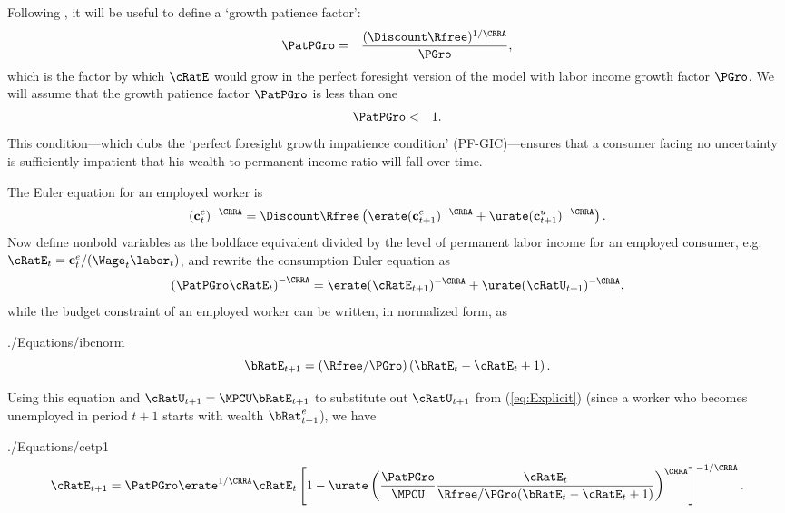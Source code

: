 \documentclass[titlepage]{\econtex}\newcommand{\texname}{cjSOE}
\begin{document}
Following \cite{BufferStockTheory}, it will be useful to define a `growth patience factor':
\begin{eqnarray}
  \PatPGro & = & \frac{(\Discount \Rfree)^{1/\CRRA}}{\PGro},
  \label{eq:PatPGro}
\end{eqnarray}
which is the factor by which $\cRatE$ would grow in the
perfect foresight version of the model with labor income growth factor
$\PGro$.  We will assume that the growth patience factor $\PatPGro$ is less than one
\begin{eqnarray}
\PatPGro & < & 1.
\label{eq:GIC}
\end{eqnarray}
This condition---which \cite{BufferStockTheory} dubs the `perfect foresight growth impatience condition' (PF-GIC)---ensures that a
consumer facing no uncertainty is sufficiently impatient that his
wealth-to-permanent-income ratio will fall over time.

The Euler equation for an employed worker is
\begin{equation*}
(\cLevE_t)^{-\CRRA} = \Discount \Rfree \left(\erate(\cLevE_{t+1})^{-\CRRA}+\urate (\cLevU_{t+1})^{-\CRRA} \right).
\end{equation*}
Now define nonbold variables as the boldface equivalent divided
by the level of permanent labor income for an employed consumer, e.g.\ $\cRatE_{t}=\cLevE_{t}/(\Wage_{t}\labor_{t})$, and rewrite the
consumption Euler equation as
\begin{equation}
\left( \PatPGro \cRatE_t \right)^{-\CRRA}= \erate (\cRatE_{t+1})^{-\CRRA}+\urate (\cRatU_{t+1})^{-\CRRA}
  \label{eq:Explicit},
\end{equation}
while the budget constraint of an employed worker can be written, in normalized form, as
\begin{verbatimwrite}{./Equations/ibcnorm}
\begin{equation}
\bRatE_{t+1} = (\Rfree/\PGro)\left(\bRatE_{t} -\cRatE_{t}+1\right).
\label{eq:ibcnorm}
\end{equation}
\end{verbatimwrite}


Using this equation and $\cRatU_{t+1} = \MPCU \bRatE_{t+1}$ to substitute out $\cRatU_{t+1}$ from (\ref{eq:Explicit}) (since a worker who becomes unemployed in period $t+1$ starts with wealth $\bRat^e_{t+1}$), we have
\begin{verbatimwrite}{./Equations/cetp1}
\begin{equation}
\cRatE_{t+1}=\PatPGro \erate^{1/\CRRA} \cRatE_t
\left[1-\urate\left(\frac{\PatPGro}{\MPCU} \frac{\cRatE_t}{\Rfree/\PGro(\bRatE_{t} -\cRatE_{t}+1)}\right)^{\CRRA}\right]^{-1/\CRRA}.
\label{eq:cetp1}
\end{equation}
\end{verbatimwrite}

\end{document}
